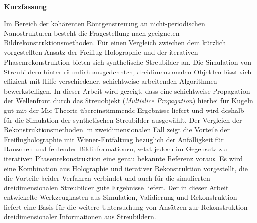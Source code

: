 	\begin{Huge}
		\textbf{Kurzfassung}\vspace{12mm}
	\end{Huge}
		
	Im Bereich der kohärenten Röntgenstreuung an nicht-periodischen Nanostrukturen besteht die Fragestellung nach geeigneten Bildrekonstruktionsmethoden. Für einen Vergleich zwischen dem kürzlich vorgestellten Ansatz der Freiflug-Holographie und der iterativen Phasenrekonstruktion bieten sich synthetische Streubilder an. Die Simulation von Streubildern hinter räumlich ausgedehnten, dreidimensionalen Objekten lässt sich effizient mit Hilfe verschiedener, schichtweise arbeitenden Algorithmen bewerkstelligen. In dieser Arbeit wird gezeigt, dass eine schichtweise Propagation der Wellenfront durch das Streuobjekt (\textit{Multislice Propagation}) hierbei für Kugeln gut mit der Mie-Theorie übereinstimmende Ergebnisse liefert und wird deshalb für die Simulation der synthetischen Streubilder ausgewählt. Der Vergleich der Rekonstruktionsmethoden im zweidimensionalen Fall zeigt die Vorteile der Freiflugholographie mit Wiener-Entfaltung bezüglich der Anfälligkeit für Rauschen und fehlender Bildinformationen, setzt jedoch im Gegensatz zur iterativen Phasenrekonstruktion eine genau bekannte Referenz voraus. Es wird eine Kombination aus Holographie und iterativer Rekonstruktion vorgestellt, die die Vorteile beider Verfahren verbindet und auch für die simulierten dreidimensionalen Streubilder gute Ergebnisse liefert. Der in dieser Arbeit entwickelte Werkzeugkasten aus Simulation, Validierung und Rekonstruktion liefert eine Basis für die weitere Untersuchung von Ansätzen zur Rekonstruktion dreidimensionaler Informationen aus Streubildern.
